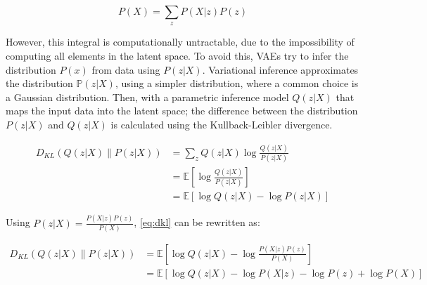 \begin{equation}
 P(X)=\sum_{z} P(X | z) P(z)
\end{equation}

However, this integral is computationally untractable, due to the impossibility of computing all elements in the latent space. To avoid this, VAEs try to infer the distribution \begin{math} P( x ) \end{math} from data using \begin{math}P(z|X)\end{math}. Variational inference approximates the distribution \begin{math}\mathbb{P}(z | X)\end{math}, using a simpler distribution, where a common choice is a Gaussian distribution. Then, with a parametric inference model \begin{math}Q(z|X)\end{math} that maps the input data into the latent space; the difference between the distribution \begin{math}P(z|X)\end{math} and \begin{math}Q(z|X)\end{math} is calculated using the Kullback-Leibler divergence.

\begin{equation}
 \begin{aligned} D_{K L}(Q(z | X) \| P(z | X)) &=\sum_{z} Q(z | X) \log \frac{Q(z | X)}{P(z | X)} \\ &=\mathbb{E}\left[\log \frac{Q(z | X)}{P(z | X)}\right] \\ &=\mathbb{E}[\log Q(z | X)-\log P(z | X)] \end{aligned}
 \label{eq:dkl}
\end{equation}

Using \begin{math}P(z | X)=\frac{P(X | z) P(z)}{P(X)}\end{math}, \ref{eq:dkl} can be rewritten as:

\begin{equation}
 \begin{aligned} D_{K L}(Q(z | X) \| P(z | X)) &=\mathbb{E}\left[\log Q(z | X)-\log \frac{P(X | z) P(z)}{P(X)}\right] \\ &=\mathbb{E}[\log Q(z | X)-\log P(X | z)-\log P(z)+\log P(X)] \end{aligned}
\end{equation}

